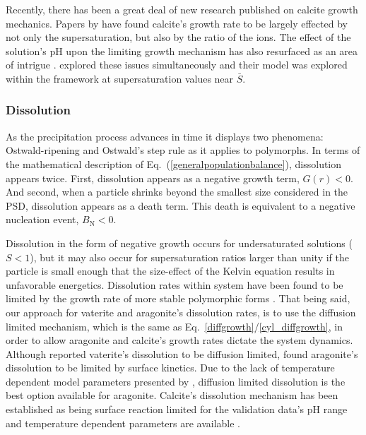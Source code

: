 \documentclass[preprint,3p,a4paper,times,12pt,authoryear]{elsarticle}
\begin{document}
Recently, there has been a great deal of new research published on calcite growth mechanics.  Papers by \citet{Stack2010,Gebrehiwet2012,Bracco2013} have found calcite's growth rate to be largely effected by not only the supersaturation, but also by the ratio of the ions.  The effect of the solution's pH upon the limiting growth mechanism has also resurfaced as an area of intrigue \citep{Ruiz-Agudo2011}.  \citet{Wolthers2012} explored these issues simultaneously and their model was explored within the framework at supersaturation values near $\bar{S}$. 

\subsubsection{Dissolution}
\label{Dissolution_Section}
As the precipitation process advances in time it displays two phenomena: Ostwald-ripening \citep{Lifshitz1961} and Ostwald's step rule \citep{Ostwald1897} as it applies to polymorphs. In terms of the mathematical description of  Eq.~(\ref{generalpopulationbalance}), dissolution appears twice. First, dissolution appears as a negative growth term, $G(r) < 0$. And second, when a particle shrinks beyond the smallest size considered in the PSD, dissolution appears as a death term. This death is equivalent to a negative nucleation event, $B_{\text{N}} < 0$.

Dissolution in the form of negative growth occurs for undersaturated solutions ($S < 1$), but it may also occur for supersaturation ratios larger than unity if the particle is small enough that the size-effect of the Kelvin equation results in unfavorable energetics.  Dissolution rates within  system have been found to be limited by the growth rate of more stable polymorphic forms \citep{Ogino1990,Kralj1997,Rodriguez-Blanco2011}.  That being said, our approach for vaterite and aragonite's dissolution rates, is to use the diffusion limited mechanism, which is the same as Eq.~\ref{diffgrowth}/\ref{cyl_diffgrowth}, in order to allow aragonite and calcite's growth rates dictate the system dynamics.  
Although \cite{Kralj1994} reported vaterite's dissolution to be diffusion limited, \cite{Chou1989} found aragonite's dissolution to be limited by surface kinetics.  Due to the lack of temperature dependent model parameters presented by \citet{Chou1989}, diffusion limited dissolution is the best option available for aragonite.  Calcite's dissolution mechanism has been established as being surface reaction limited for the validation data's pH range \citep{Chou1989,Gutjahr1996,Cubillas2005} and temperature dependent parameters are available \citep{Plummer1978}.  
\end{document}
